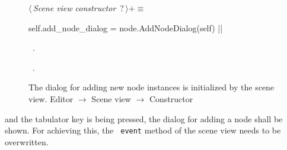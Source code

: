 \documentclass[%
    a4paper,    %
    justified,  %
    nobib,      %
    openany     %
]{tufte-book}
\begin{document}
\begin{figure}
\begin{flushleft} \small
\begin{minipage}{\linewidth}\label{scrap150}\raggedright\small
{} $\langle\,${\itshape Scene view constructor}\nobreak\ {\footnotesize {?}}$\,\rangle+\equiv$
\vspace{-1ex}
\begin{pythoncode}
    self.add_node_dialog = node.AddNodeDialog(self)
|\NWsep|
\end{pythoncode}
\vspace{1.5ex}
\footnotesize
\begin{list}{}{\setlength{\itemsep}{-\parsep}\setlength{\itemindent}{-\leftmargin}}
\item \NWtxtMacroDefBy\ .
\item \NWtxtMacroRefIn\ .

\item{}
\end{list}
\end{minipage}\vspace{4ex}
\end{flushleft}
\caption{The dialog for adding new node instances is initialized by the scene
  view.
  \newline{}\newline{}Editor $\rightarrow$ Scene view $\rightarrow$ Constructor}
\label{editor:lst:scene-view:constructor:add-node-dialog}
\end{figure}

 and the tabulator key is being
pressed, the dialog for adding a node shall be shown. For achieving this, the
~\verb=event= method of the scene view needs to be overwritten.
\end{document}
